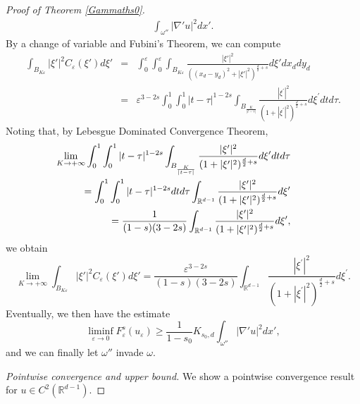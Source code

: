 \documentclass[11pt]{article}
\def\e{\varepsilon}
\begin{document}
\begin{proof}[Proof of Theorem \rm\ref{Gammaths0}]
\begin{eqnarray}
\int_{\omega''} |\nabla' u|^2 dx' .
\end{eqnarray}
By a change of variable and Fubini's Theorem, we can compute
\begin{eqnarray*}
\int_{B_{K\e}}|\xi'|^2 C_\e(\xi') d\xi'
&=&\int_0^\e\int_0^\e\int_{B_{K\e}}\frac{|\xi'|^2}{((x_d-y_d)^2+|\xi'|^2)^{\frac d2+s}}d\xi'dx_d dy_d
\\
&=&\e^{3-2s}\int_0^1\int_0^1|t-\tau|^{1-2s}\int_{B_{\frac{K}{|t-\tau|}}}\frac{|\xi^\prime|^2}{(1+|\xi^\prime|^2)^{\frac d2+s}}d\xi^\prime dt d\tau. 
\end{eqnarray*}
Noting that, by Lebesgue Dominated Convergence Theorem,  
\begin{eqnarray*}
&&\hskip-1cm\lim_{K\to+\infty}\int_0^1\int_0^1|t-\tau|^{1-2s}\int_{B_{\frac{K}{|t-\tau|}}}\frac{|\xi^\prime|^2}{(1+|\xi^\prime|^2)^{\frac d2+s}}d\xi^\prime dt d\tau\\
&&=\int_0^1\int_0^1|t-\tau|^{1-2s} dt d\tau\int_{\mathbb R^{d-1}}\frac{|\xi^\prime|^2}{(1+|\xi^\prime|^2)^{\frac d2+s}}d\xi^\prime \\
&&=
\frac1{(1-s)(3-2s)}\int_{\mathbb R^{d-1}}\frac{|\xi^\prime|^2}{(1+|\xi^\prime|^2)^{\frac d2+s}}d\xi^\prime, 
\end{eqnarray*}
we obtain
\begin{equation}\label{limK}
\lim_{K\to+\infty} \int_{B_{K\e}}|\xi'|^2 C_\e(\xi') d\xi'
=\frac{\e^{3-2s}}{(1-s)(3-2s)}\int_{\mathbb R^{d-1}}\frac{|\xi^\prime|^2}{(1+|\xi^\prime|^2)^{\frac d2+s}}d\xi^\prime. 
\end{equation}
Eventually, we then have the estimate 
$$
\liminf_{\e\to 0}F^s_\e(u_\e)\ge \frac{1}{1-s_0}K_{s_0,d}\int_{\omega''} |\nabla' u|^2 dx',
$$
and we can finally let $\omega''$ invade $\omega$. 
\smallskip

{\em Pointwise convergence and upper bound.}
We show a pointwise convergence result for $u\in C^2(\mathbb R^{d-1})$. 


\end{proof}
\end{document}
